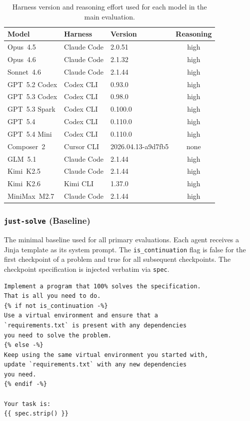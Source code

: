 \begin{table}[h]
\centering
\caption{Harness version and reasoning effort used for each model in the main evaluation.}
\label{tab:agent-versions}
\small
\begin{tabular}{lllc}
\toprule
Model & Harness & Version & Reasoning \\
\midrule
Opus~4.5      & Claude Code & 2.0.51  & high \\
Opus~4.6      & Claude Code & 2.1.32  & high \\
Sonnet~4.6    & Claude Code & 2.1.44  & high \\
\midrule
GPT~5.2 Codex & Codex CLI & 0.93.0  & high \\
GPT~5.3 Codex & Codex CLI & 0.98.0  & high \\
GPT~5.3 Spark & Codex CLI & 0.100.0 & high \\
GPT~5.4       & Codex CLI & 0.110.0 & high \\
GPT~5.4 Mini  & Codex CLI & 0.110.0 & high \\
\midrule
Composer~2    & Cursor CLI  & 2026.04.13-a9d7fb5 & none \\
GLM~5.1       & Claude Code & 2.1.44  & high \\
Kimi~K2.5     & Claude Code & 2.1.44  & high \\
Kimi~K2.6     & Kimi CLI    & 1.37.0  & high \\
MiniMax~M2.7  & Claude Code & 2.1.44  & high \\
\bottomrule
\end{tabular}
\end{table}

\subsubsection{\texttt{just-solve} (Baseline)}\label{sec:prompt-intervention-raw}

The minimal baseline used for all primary evaluations. Each agent receives a Jinja template as its system prompt. The \texttt{is\_continuation} flag is false for the first checkpoint of a problem and true for all subsequent checkpoints. The checkpoint specification is injected verbatim via \texttt{spec}.

\begin{lstlisting}[style=specblock, caption={\texttt{just-solve} prompt template}, label={lst:just-solve-prompt}]
Implement a program that 100% solves the specification.
That is all you need to do.
{% if not is_continuation -%}
Use a virtual environment and ensure that a
`requirements.txt` is present with any dependencies
you need to solve the problem.
{% else -%}
Keep using the same virtual environment you started with,
update `requirements.txt` with any new dependencies
you need.
{% endif -%}

Your task is:
{{ spec.strip() }}
\end{lstlisting}

